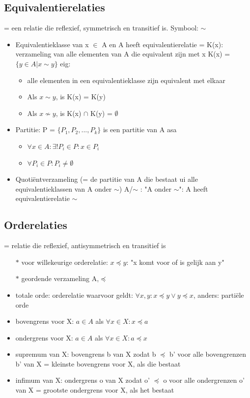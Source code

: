 \documentclass{article}
\begin{document}
\subsection{Equivalentierelaties}
= een relatie die reflexief, symmetrisch en transitief is. Symbool: $\sim$
\begin{itemize}
    \item Equivalentieklasse van x $\in$ A en A heeft equivalentierelatie
    \newline \quad = K(x): verzameling van alle elementen van A die equivalent zijn met x
    \newline \quad K(x) = $\{y \in A| x \sim y\}$
    \newline eig:
    \begin{itemize}
        \item alle elementen in een equivalentieklasse zijn equivalent met elkaar
        \item Als $x \sim y$, is K(x) = K(y)
        \item Als $x \not \sim y$, is K(x) $\cap$ K(y) = $\emptyset$
    \end{itemize}
    \item Partitie: P = $\{P_1,P_2,...,P_k\}$ is een partitie van A asa
    \begin{itemize}
        \item $\forall x \in A: \exists ! P_i \in P: x \in P_i$
        \item $\forall P_i \in P: P_i \neq \emptyset$
    \end{itemize}
    \item Quotiëntverzameling (= de partitie van A die bestaat ui alle equivalentieklassen van A onder $\sim$) A/$\sim$ : "A onder $\sim$": A heeft equivalentierelatie $\sim$
\end{itemize}
\subsection{Orderelaties}
= relatie die reflexief, antisymmetrisch en transitief is
\begin{itemize}
    \item[$*$] voor willekeurige orderelatie: $x \preceq y$: "x komt voor of is gelijk aan y"
    \item[$*$] geordende verzameling A,$\preceq$
\end{itemize}
\begin{itemize}
    \item totale orde: orderelatie waarvoor geldt: $\forall x,y: x \preceq y \lor y \preceq x$, anders: partiële orde
    \item bovengrens voor X: $a \in A$ als $\forall x \in X: x \preceq a$
    \item ondergrens voor X: $a \in A$ als $\forall x \in X: a \preceq x$
    \item supremum van X: bovengrens b van X zodat b $\preceq$ b' voor alle bovengrenzen b' van X
    \newline = kleinste bovengrens voor X, als die bestaat
    \item infimum van X: ondergrens o van X zodat o' $\preceq$ o voor alle ondergrenzen o' van X
    \newline = grootste ondergrens voor X, als het bestaat
\end{itemize}
\end{document}
